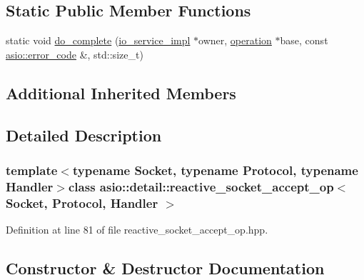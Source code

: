 \subsection*{Static Public Member Functions}
\begin{DoxyCompactItemize}
\item 
static void \hyperlink{classasio_1_1detail_1_1reactive__socket__accept__op_aeca9bea042a43ede1d5dfda7296bbee0}{do\+\_\+complete} (\hyperlink{namespaceasio_1_1detail_a6d61d9b8e53c11288be549d82aec5a42}{io\+\_\+service\+\_\+impl} $\ast$owner, \hyperlink{namespaceasio_1_1detail_a338968609bec20e37145309f8f9ec936}{operation} $\ast$base, const \hyperlink{classasio_1_1error__code}{asio\+::error\+\_\+code} \&, std\+::size\+\_\+t)
\end{DoxyCompactItemize}
\subsection*{Additional Inherited Members}


\subsection{Detailed Description}
\subsubsection*{template$<$typename Socket, typename Protocol, typename Handler$>$class asio\+::detail\+::reactive\+\_\+socket\+\_\+accept\+\_\+op$<$ Socket, Protocol, Handler $>$}



Definition at line 81 of file reactive\+\_\+socket\+\_\+accept\+\_\+op.\+hpp.



\subsection{Constructor \& Destructor Documentation}
\hypertarget{classasio_1_1detail_1_1reactive__socket__accept__op_a4ce11cb97a4219aeb6b80966e32982a4}{}
